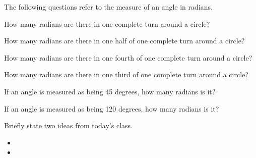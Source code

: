 \begin{problem}
\item The following questions refer to the measure of an angle in
  radians.
  \begin{subproblem}
  \item How many radians are there in one complete turn around a
    circle?
    \vfill
  \item How many radians are there in one half of one complete turn
    around a circle?
    \vfill
  \item How many radians are there in one fourth of one complete turn
    around a circle?
    \vfill
  \item How many radians are there in one third  of one complete turn
    around a circle?
    \vfill
  \item If an angle is measured as being 45 degrees, how many radians
    is it?
    \vfill
  \item If an angle is measured as being 120 degrees, how many radians
    is it?
    \vfill
  \end{subproblem}

\end{problem}

\postClass

\begin{problem}
\item Briefly state two ideas from today's class.
  \begin{itemize}
  \item
  \item
  \end{itemize}
\item
  \begin{subproblem}
    \item
  \end{subproblem}
\end{problem}


